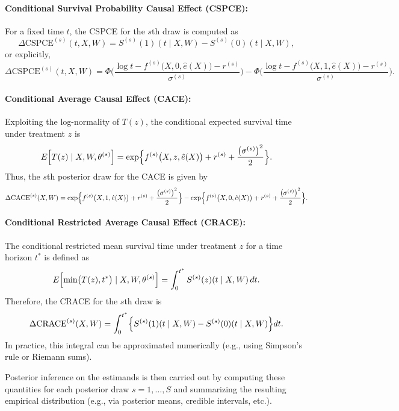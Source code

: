 \documentclass[useAMS,referee]{biom}
\begin{document}
\paragraph{Conditional Survival Probability Causal Effect (CSPCE):}  
For a fixed time \(t\), the CSPCE for the \(s\)th draw is computed as
\[
\Delta \text{CSPCE}^{(s)}(t, X, W) = S^{(s)}(1)(t\mid X,W) - S^{(s)}(0)(t\mid X,W),
\]
or explicitly,
\[
\Delta \text{CSPCE}^{(s)}(t, X, W) = \Phi\Biggl(\frac{\log t - f^{(s)}\bigl(X,0,\hat{e}(X)\bigr) - r^{(s)}}{\sigma^{(s)}}\Biggr) - \Phi\Biggl(\frac{\log t - f^{(s)}\bigl(X,1,\hat{e}(X)\bigr) - r^{(s)}}{\sigma^{(s)}}\Biggr).
\]

\paragraph{Conditional Average Causal Effect (CACE):}  
Exploiting the log-normality of \(T(z)\), the conditional expected survival time under treatment \(z\) is
\[
E\Bigl[T(z) \mid X,W,\theta^{(s)}\Bigr] = \exp\Bigl\{ f^{(s)}\bigl(X,z,\hat{e}(X)\bigr) + r^{(s)} + \frac{\bigl(\sigma^{(s)}\bigr)^2}{2} \Bigr\}.
\]
Thus, the \(s\)th posterior draw for the CACE is given by
\[
\Delta \text{CACE}^{(s)}(X, W) = \exp\Bigl\{ f^{(s)}\bigl(X,1,\hat{e}(X)\bigr) + r^{(s)} + \frac{\bigl(\sigma^{(s)}\bigr)^2}{2} \Bigr\} - \exp\Bigl\{ f^{(s)}\bigl(X,0,\hat{e}(X)\bigr) + r^{(s)} + \frac{\bigl(\sigma^{(s)}\bigr)^2}{2} \Bigr\}.
\]

\paragraph{Conditional Restricted Average Causal Effect (CRACE):}  
The conditional restricted mean survival time under treatment \(z\) for a time horizon \(t^*\) is defined as
\[
E\Bigl[\min\bigl(T(z),t^*\bigr) \mid X,W,\theta^{(s)}\Bigr] = \int_{0}^{t^*} S^{(s)}(z)(t\mid X,W) \, dt.
\]
Therefore, the CRACE for the \(s\)th draw is
\[
\Delta \text{CRACE}^{(s)}(X, W) = \int_{0}^{t^*} \Bigl\{ S^{(s)}(1)(t\mid X,W) - S^{(s)}(0)(t\mid X,W) \Bigr\} dt.
\]
In practice, this integral can be approximated numerically (e.g., using Simpson's rule or Riemann sums).

Posterior inference on the estimands is then carried out by computing these quantities for each posterior draw \(s=1,\ldots,S\) and summarizing the resulting empirical distribution (e.g., via posterior means, credible intervals, etc.).
\end{document}
